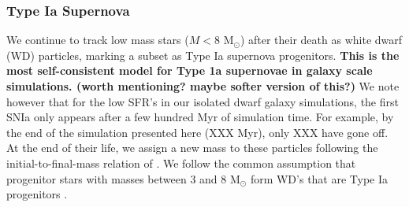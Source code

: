 \documentclass[twocolumn]{aastex61}
\begin{document}
\subsubsection{Type Ia Supernova}
\label{sec:Type Ia}
We continue to track low mass stars ($M < 8$ M$_{\odot}$) after their death as white dwarf (WD) particles, marking a subset as Type Ia supernova progenitors. \textbf{This is the most self-consistent model for Type 1a supernovae in galaxy scale simulations. (worth mentioning? maybe softer version of this?)} We note however that for the low SFR's in our isolated dwarf galaxy simulations, the first SNIa only appears after a few hundred Myr of simulation time. For example, by the end of the simulation presented here (XXX Myr), only XXX have gone off. At the end of their life, we assign a new mass to these particles following the initial-to-final-mass relation of \citet{Salaris2009}.
We follow the common assumption that progenitor stars with masses between 3 and 8 M$_{\odot}$ form WD's that are Type Ia progenitors \citep[see][ and references therein]{Cote2017}. 
\end{document}

